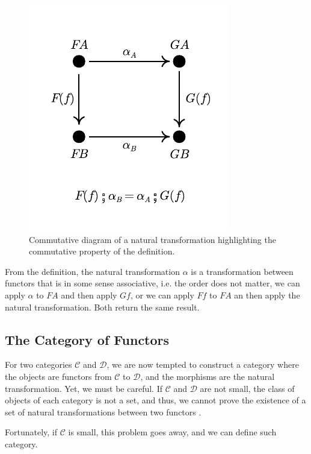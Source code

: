 \begin{figure}[H]
	\begin{center}
		\includegraphics{./notebooks/NaturalTransformation.pdf}
	\end{center}
	\caption{Commutative diagram of a natural transformation highlighting the commutative property of the definition.}
	\label{fig:NaturalTransformation}
\end{figure}

From the definition, the natural transformation $\alpha$ is a transformation between functors
that is in some sense associative, i.e. the order does not matter, we can apply $\alpha$
to $FA$ and then apply $Gf$, or we can apply $Ff$ to $FA$ an then apply the natural transformation. Both
return the same result.

\subsection{The Category of Functors}

For two categories $\mathcal C$ and $\mathcal D$, we are now tempted to construct a category
where the objects are functors from $\mathcal C$ to $\mathcal D$, and the
morphisms are the natural transformation.
Yet, we must be careful. If $\mathcal C$ and $\mathcal D$ are not small, the
class of objects of each category is not a set, and thus, we cannot
prove the existence of a set of natural transformations between
two functors \citep{borceux1994handbook}.

Fortunately, if $\mathcal C$ is small, this problem goes away, and
we can define such category.

